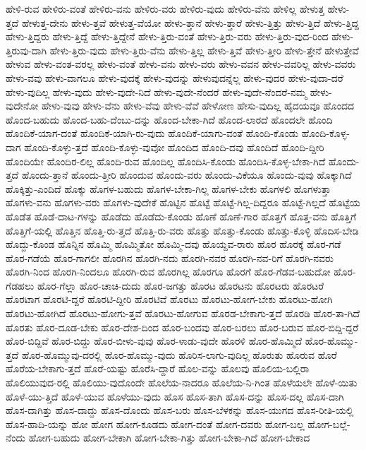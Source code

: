{ಹೇಳಿ-ರುವ
ಹೇಳಿರು-ವಂತೆ
ಹೇಳಿರು-ವನು
ಹೇಳಿರು-ವರು
ಹೇಳಿರು-ವುದು
ಹೇಳಿರು-ವೆನು
ಹೇಳಿಲ್ಲ
ಹೇಳುತ್ತ
ಹೇಳು-ತ್ತದೆ
ಹೇಳುತ್ತ-ದೇನು
ಹೇಳು-ತ್ತವೆ
ಹೇಳುತ್ತ-ವೆಯೋ
ಹೇಳು-ತ್ತಾನೆ
ಹೇಳು-ತ್ತಾರೆ
ಹೇಳು-ತ್ತಿತ್ತು
ಹೇಳು-ತ್ತಿದೆ
ಹೇಳು-ತ್ತಿದ್ದ
ಹೇಳು-ತ್ತಿದ್ದರು
ಹೇಳು-ತ್ತಿದ್ದೆ
ಹೇಳು-ತ್ತಿದ್ದೇನೆ
ಹೇಳು-ತ್ತಿರು-ವಂತೆ
ಹೇಳು-ತ್ತಿರು-ವರು
ಹೇಳು-ತ್ತಿರು-ವುದ-ರಿಂದ
ಹೇಳು-ತ್ತಿರುವು-ದಾಗಿ
ಹೇಳು-ತ್ತಿರು-ವುದು
ಹೇಳು-ತ್ತಿರು-ವೆನು
ಹೇಳು-ತ್ತಿಲ್ಲ
ಹೇಳು-ತ್ತಿವೆ
ಹೇಳು-ತ್ತೀರಿ
ಹೇಳು-ತ್ತೇನೆ
ಹೇಳುತ್ತೇವೆ
ಹೇಳುವ
ಹೇಳು-ವಂತ-ವರಲ್ಲ
ಹೇಳು-ವಂತೆ
ಹೇಳು-ವನು
ಹೇಳು-ವರು
ಹೇಳು-ವವನ
ಹೇಳು-ವವರಿಲ್ಲ
ಹೇಳು-ವವರು
ಹೇಳು-ವವು
ಹೇಳು-ವಾಗಲೂ
ಹೇಳು-ವುದಕ್ಕೆ
ಹೇಳು-ವುದನ್ನು
ಹೇಳುವುದನ್ನೆಲ್ಲ
ಹೇಳು-ವುದರ
ಹೇಳು-ವುದಾ-ದರೆ
ಹೇಳು-ವುದಿಲ್ಲ
ಹೇಳು-ವುದು
ಹೇಳು-ವುದೇ-ನಿದೆ
ಹೇಳು-ವುದೇ-ನೆಂದರೆ
ಹೇಳು-ವುದೇ-ನೆಂದರೆ-ನಮ್ಮ
ಹೇಳು-ವುದೇನೋ
ಹೇಳು-ವುವು
ಹೇಳು-ವೆನು
ಹೇಳು-ವೆವು
ಹೇಳು-ವೆವೆ
ಹೇಳೋಣ
ಹೇಸು-ವುದಿಲ್ಲ
ಹೈದಯವೂ
ಹೊಂದದ
ಹೊಂದ-ಬಹುದು
ಹೊಂದ-ಬಹು-ದೆಂಬು-ದನ್ನು
ಹೊಂದ-ಬೇಕಾ-ಗಿದೆ
ಹೊಂದ-ಲಾರದೆ
ಹೊಂದಲೇ
ಹೊಂದಿ
ಹೊಂದಿಕೆ-ಯಾಗ-ದಂತೆ
ಹೊಂದಿಕೆ-ಯಾಗಿ-ರು-ವುದು
ಹೊಂದಿಕೆ-ಯಾಗು-ವಂತೆ
ಹೊಂದಿ-ಕೊಂಡು
ಹೊಂದಿ-ಕೊಳ್ಳ-ದಾಗ
ಹೊಂದಿ-ಕೊಳ್ಳು-ತ್ತದೆ
ಹೊಂದಿ-ಕೊಳ್ಳು-ವುವೋ
ಹೊಂದಿದ
ಹೊಂದಿ-ದವು
ಹೊಂದಿದೆ
ಹೊಂದಿ-ದ್ದೀರಿ
ಹೊಂದಿಯೇ
ಹೊಂದಿರ-ಲಿಲ್ಲ
ಹೊಂದಿ-ರುವ
ಹೊಂದಿಲ್ಲ
ಹೊಂದಿಸಿ-ಕೊಂಡು
ಹೊಂದಿಸಿ-ಕೊಳ್ಳ-ಬೇಕಾ-ಗಿದೆ
ಹೊಂದು-ತ್ತದೆ
ಹೊಂದು-ತ್ತಾನೆ
ಹೊಂದು-ತ್ತೀರಿ
ಹೊಂದುವ
ಹೊಂದು-ವರು
ಹೊಂದು-ವಿಕೆಯೂ
ಹೊಂದು-ವುವು
ಹೊಕ್ಕಾಗಿದೆ
ಹೊಕ್ಕಿತ್ತು-ಎಂದಿದೆ
ಹೊಕ್ಕು
ಹೊಗಳ-ಬಹುದು
ಹೊಗಳ-ಬೇಕಾ-ಗಿಲ್ಲ
ಹೊಗಳ-ಬೇಕು
ಹೊಗಳಲಿ
ಹೊಗಳುತ್ತಾ
ಹೊಗಳು-ವನು
ಹೊಗಳು-ವರು
ಹೊಗಳು-ವುದೇಕೆ
ಹೊಟ್ಟಿನ
ಹೊಟ್ಟೆ
ಹೊಟ್ಟೆ-ಗಿಲ್ಲ-ದಿದ್ದರೂ
ಹೊಟ್ಟೆ-ಗಿಲ್ಲದೆ
ಹೊಟ್ಟೆಯ
ಹೊಡೆತ
ಹೊಡೆ-ದಾಟ-ಗಳನ್ನು
ಹೊಡೆದು
ಹೊಡೆದು-ಕೊಂಡು
ಹೊಣೆ
ಹೊಣೆ-ಗಾರ
ಹೊತ್ತಗೆ
ಹೊತ್ತ-ವನು
ಹೊತ್ತಿಗೆ
ಹೊತ್ತಿಗೆ-ಯಲ್ಲಿ
ಹೊತ್ತಿನ
ಹೊತ್ತಿ-ರು-ತ್ತದೆ
ಹೊತ್ತಿ-ರು-ವರು
ಹೊತ್ತು
ಹೊತ್ತು-ಕೊಂಡು
ಹೊತ್ತು-ಕೊಳ್ಳಿ
ಹೊದಿಸ-ಬೇಡಿ
ಹೊದ್ದು-ಕೊಂಡ
ಹೊನ್ನಿನ
ಹೊಮ್ಮಿ
ಹೊಮ್ಮಿತೋ
ಹೊಮ್ಮಿ-ದವು
ಹೊಯ್ದವ-ರಾರು
ಹೊರ
ಹೊರಕ್ಕೆ
ಹೊರ-ಗಡೆ
ಹೊರ-ಗಡೆಯೆ
ಹೊರ-ಗಾಗಲೀ
ಹೊರಗಿನ
ಹೊರಗಿ-ನದು
ಹೊರಗಿ-ನವರ
ಹೊರಗಿ-ನವ-ರಿಗೆ
ಹೊರಗಿ-ನವರು
ಹೊರಗಿ-ನಿಂದ
ಹೊರಗಿ-ನಿಂದಲೂ
ಹೊರಗಿ-ರುವ
ಹೊರಗಿಲ್ಲ
ಹೊರಗೂ
ಹೊರಗೆ
ಹೊರ-ಗೆಡವ-ಬಹುದೋ
ಹೊರ-ಗೆಡಹಲು
ಹೊರ-ಗೆಲ್ಲಾ
ಹೊರ-ಚಾಚಿ-ದುದು
ಹೊರ-ಜಗತ್ತು
ಹೊರಟ
ಹೊರಟನು
ಹೊರಟರು
ಹೊರಟರೆ
ಹೊರಟಾಗ
ಹೊರಟಿ-ದ್ದರೆ
ಹೊರಟಿ-ದ್ದೀರಿ
ಹೊರಟಿವೆ
ಹೊರಟು
ಹೊರಟು-ಹೋಗ-ಬೇಕು
ಹೊರಟು-ಹೋಗಿ
ಹೊರಟು-ಹೋಗಿದೆ
ಹೊರಟು-ಹೋಗು-ತ್ತವೆ
ಹೊರಟು-ಹೋಗುವ
ಹೊರಡ-ಬೇಕಾಗು-ತ್ತದೆ
ಹೊರಡಿ
ಹೊರ-ತಾ-ಗಿದೆ
ಹೊರತು
ಹೊರ-ದೂಡ-ಬೇಕು
ಹೊರ-ದೇಶ-ದಿಂದ
ಹೊರ-ಬಂದವು
ಹೊರ-ಬರಲು
ಹೊರ-ಬರುವ
ಹೊರ-ಬಿದ್ದಿ-ದ್ದರೆ
ಹೊರ-ಬಿದ್ದಿವೆ
ಹೊರ-ಬಿದ್ದು
ಹೊರ-ಬೀಳು-ವುವು
ಹೊರ-ಳಾಡು-ವುದೇ
ಹೊರಳಿ
ಹೊರ-ಹೊಮ್ಮಿದೆ
ಹೊರ-ಹೊಮ್ಮು-ತ್ತದೆ
ಹೊರ-ಹೊಮ್ಮುವು-ದರಲ್ಲಿ
ಹೊರ-ಹೊಮ್ಮು-ವುದು
ಹೊರಿಸ-ಲಾಗು-ವುದಿಲ್ಲ
ಹೊರುತು
ಹೊರುವ
ಹೊರೆ
ಹೊರೆಯ-ಬೇಕಾಗು-ತ್ತದೆ
ಹೊರೆ-ಯಷ್ಟು
ಹೊರೆಸಿ-ದ್ದಾರೆ
ಹೊಲ-ವನ್ನು
ಹೊಲವು
ಹೊಲಿಯ-ಬಲ್ಲಿರಾ
ಹೊಲಿಯುವುದ-ರಲ್ಲಿ
ಹೊಲಿಯು-ವುದೊಂದೇ
ಹೊಲೆಯ-ನಾದರೂ
ಹೊಲೆಯ-ನಿ-ಗಿಂತ
ಹೊಳೆಯಲೇ
ಹೊಳೆ-ಯಿತು
ಹೊಳೆ-ಯು-ತ್ತಿದೆ
ಹೊಳೆ-ಯುವ
ಹೊಳೆಯು-ವುದು
ಹೊಸ
ಹೊಸ-ತಾಗಿ
ಹೊಸ-ದನ್ನು
ಹೊಸ-ದಲ್ಲ
ಹೊಸ-ದಾಗಿ
ಹೊಸ-ದಾಗಿತ್ತು
ಹೊಸ-ದಾದ್ದು
ಹೊಸ-ದೊಂದು
ಹೊಸ-ಬರು
ಹೊಸ-ಬೆಳಕನ್ನು
ಹೊಸ-ಯುಗದ
ಹೊಸ-ರೀತಿ-ಯಲ್ಲಿ
ಹೊಸ-ಹಾದಿ-ಯನ್ನು
ಹೋ
ಹೋಗ
ಹೋಗ-ಕೂಡದು
ಹೋಗ-ದಂತೆ
ಹೋಗ-ದವರು
ಹೋಗ-ಬಲ್ಲ
ಹೋಗ-ಬಲ್ಲೆ-ನೆಂದು
ಹೋಗ-ಬಹುದು
ಹೋಗ-ಬೇಕಾಗಿ
ಹೋಗ-ಬೇಕಾ-ಗಿತ್ತು
ಹೋಗ-ಬೇಕಾ-ಗಿದೆ
ಹೋಗ-ಬೇಕಾದ
}
